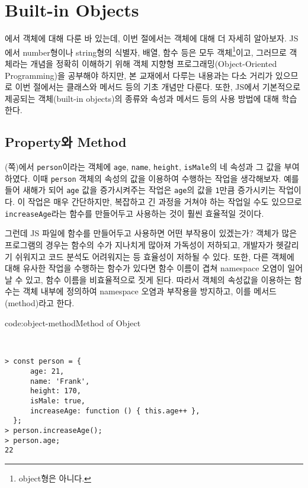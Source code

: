 \section{Built-in Objects} \label{sect:built-in-objects}

에서 객체에 대해 다룬 바 있는데, 이번 절에서는 객체에 대해 더 자세히 알아보자. JS에서 number형이나 string형의 식별자, 배열, 함수 등은 모두 객체\footnote{object형은 아니다.}이고, 그러므로 객체라는 개념을 정확히 이해하기 위해 객체 지향형 프로그래밍(Object-Oriented Programming)을 공부해야 하지만, 본 교재에서 다루는 내용과는 다소 거리가 있으므로 이번 절에서는 클래스와 메서드 등의 기초 개념만 다룬다. 또한, JS에서 기본적으로 제공되는 객체(built-in objects)의 종류와 속성과 메서드 등의 사용 방법에 대해 학습한다.

\subsection*{Property와 Method}

(\pageref{code:object-type}쪽)에서 \texttt{person}이라는 객체에 \texttt{age}, \texttt{name}, \texttt{height}, \texttt{isMale}의 네 속성과 그 값을 부여하였다. 이때 \texttt{person} 객체의 속성의 값을 이용하여 수행하는 작업을 생각해보자. 예를 들어 새해가 되어 \texttt{age} 값을 증가시켜주는 작업은 \texttt{age}의 값을 \texttt{1}만큼 증가시키는 작업이다. 이 작업은 매우 간단하지만, 복잡하고 긴 과정을 거쳐야 하는 작업일 수도 있으므로 \texttt{increaseAge}라는 함수를 만들어두고 사용하는 것이 훨씬 효율적일 것이다.

그런데 JS 파일에 함수를 만들어두고 사용하면 어떤 부작용이 있겠는가? 객체가 많은 프로그램의 경우는 함수의 수가 지나치게 많아져 가독성이 저하되고, 개발자가 헷갈리기 쉬워지고 코드 분석도 어려워지는 등 효율성이 저하될 수 있다. 또한, 다른 객체에 대해 유사한 작업을 수행하는 함수가 있다면 함수 이름이 겹쳐 namespace 오염이 일어날 수 있고, 함수 이름을 비효율적으로 짓게 된다. 따라서 객체의 속성값을 이용하는 함수는 객체 내부에 정의하여 namespace 오염과 부작용을 방지하고, 이를 메서드(method)라고 한다.

\begin{codeenv}{code:object-method}{Method of Object}\begin{verbatim}


> const person = {
      age: 21,
      name: 'Frank',
      height: 170,
      isMale: true,
      increaseAge: function () { this.age++ },
  };
> person.increaseAge();
> person.age;
22
\end{verbatim}
\end{codeenv}

